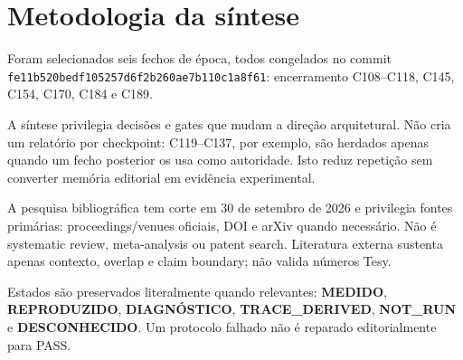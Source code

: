 \section{Metodologia da síntese}
Foram selecionados seis fechos de época, todos congelados no commit \texttt{fe11b520\allowbreak bedf1052\allowbreak 57d6f2b2\allowbreak 60ae7b11\allowbreak 0c1a8f61}: encerramento C108--C118, C145, C154, C170, C184 e C189.      

A síntese privilegia decisões e gates que mudam a direção arquitetural. Não cria um relatório por checkpoint: C119--C137, por exemplo, são herdados apenas quando um fecho posterior os usa como autoridade. Isto reduz repetição sem converter memória editorial em evidência experimental.

A pesquisa bibliográfica tem corte em 30 de setembro de 2026 e privilegia fontes primárias: proceedings/venues oficiais, DOI e arXiv quando necessário. Não é systematic review, meta-analysis ou patent search. Literatura externa sustenta apenas contexto, overlap e claim boundary; não valida números Tesy.

Estados são preservados literalmente quando relevantes: \textbf{MEDIDO}, \textbf{REPRODUZIDO}, \textbf{DIAGNÓSTICO}, \textbf{TRACE\_DERIVED}, \textbf{NOT\_RUN} e \textbf{DESCONHECIDO}. Um protocolo falhado não é reparado editorialmente para PASS.
